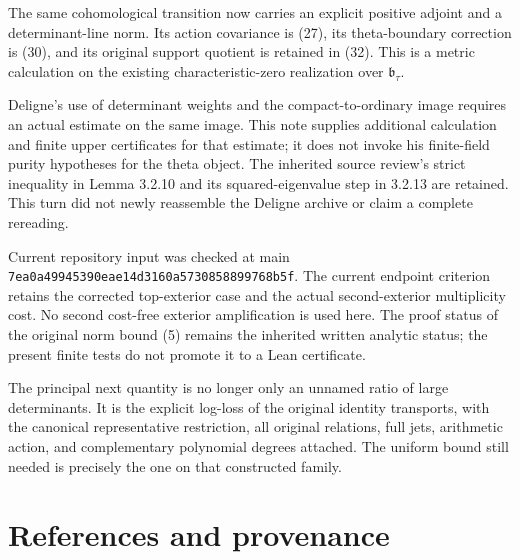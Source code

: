 \documentclass[
  11pt,
]{article}
\begin{document}
The same cohomological transition now carries an explicit positive
adjoint and a determinant-line norm. Its action covariance is (27), its
theta-boundary correction is (30), and its original support quotient is
retained in (32). This is a metric calculation on the existing
characteristic-zero realization over \(\mathfrak b_\tau\).

Deligne's use of determinant weights and the compact-to-ordinary image
requires an actual estimate on the same image. This note supplies
additional calculation and finite upper certificates for that estimate;
it does not invoke his finite-field purity hypotheses for the theta
object. The inherited source review's strict inequality in Lemma 3.2.10
and its squared-eigenvalue step in 3.2.13 are retained. This turn did
not newly reassemble the Deligne archive or claim a complete rereading.

Current repository input was checked at main
\texttt{7ea0a49945390eae14d3160a5730858899768b5f}. The current endpoint
criterion retains the corrected top-exterior case and the actual
second-exterior multiplicity cost. No second cost-free exterior
amplification is used here. The proof status of the original norm bound
(5) remains the inherited written analytic status; the present finite
tests do not promote it to a Lean certificate.

The principal next quantity is no longer only an unnamed ratio of large
determinants. It is the explicit log-loss of the original identity
transports, with the canonical representative restriction, all original
relations, full jets, arithmetic action, and complementary polynomial
degrees attached. The uniform bound still needed is precisely the one on
that constructed family.

\section{References and provenance}\label{references-and-provenance}
\end{document}
